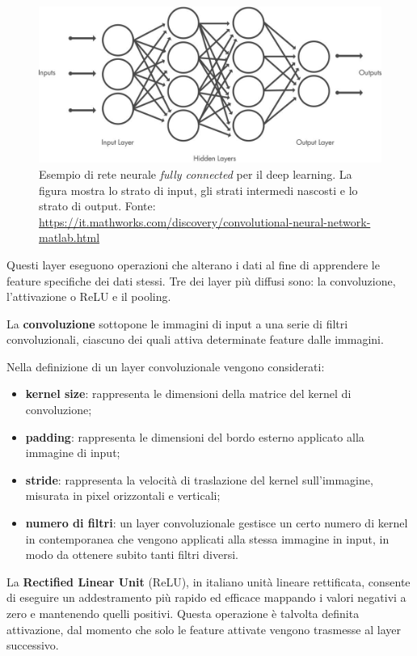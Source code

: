 \begin{figure}[H]
    \centering
    \includegraphics[scale=0.34]{images/cnn_layers.jpg}
    \caption[Esempio di rete neurale per il deep learning.]{Esempio di rete neurale \textit{fully connected} per il deep learning. La figura mostra lo strato di input, gli strati intermedi nascosti e lo strato di output. Fonte: \url{https://it.mathworks.com/discovery/convolutional-neural-network-matlab.html}}
    \label{fig:cnn_layers}
\end{figure}

Questi layer eseguono operazioni che alterano i dati al fine di apprendere le feature specifiche dei dati stessi. Tre dei layer più diffusi sono: la convoluzione, l’attivazione o ReLU e il pooling.

La \textbf{convoluzione} sottopone le immagini di input a una serie di filtri convoluzionali, ciascuno dei quali attiva determinate feature dalle immagini.

Nella definizione di un layer convoluzionale vengono considerati:
\begin{itemize}
    \item \textbf{kernel size}: rappresenta le dimensioni della matrice del kernel di convoluzione;
    \item \textbf{padding}: rappresenta le dimensioni del bordo esterno applicato alla immagine di input;
    \item \textbf{stride}: rappresenta la velocità di traslazione del kernel sull’immagine, misurata in pixel orizzontali e verticali;
    \item \textbf{numero di filtri}: un layer convoluzionale gestisce un certo numero di kernel in contemporanea che vengono applicati alla stessa immagine in input, in modo da ottenere subito tanti filtri diversi.
\end{itemize}

La \textbf{Rectified Linear Unit} (ReLU), in italiano unità lineare rettificata, consente di eseguire un addestramento più rapido ed efficace mappando i valori negativi a zero e mantenendo quelli positivi. Questa operazione è talvolta definita attivazione, dal momento che solo le feature attivate vengono trasmesse al layer successivo.

